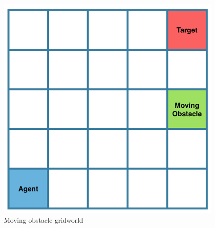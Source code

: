 \documentclass[letterpaper]{article}
\newcommand{\sw}[1]{\textcolor{red}{SW: #1}}
\newcommand{\jm}[1]{\textcolor{blue}{Joao: #1}}
\newcommand{\sw}[1]{}
\newcommand{\jm}[1]{}
\begin{document}

\begin{figure}[t]
  \centering
  \includegraphics[bb=0 0 533 539,width=0.5\columnwidth]{images/gridworld.png}
  \caption{Moving obstacle gridworld 	\label{fig:gridworld}}
\end{figure}
\end{document}
